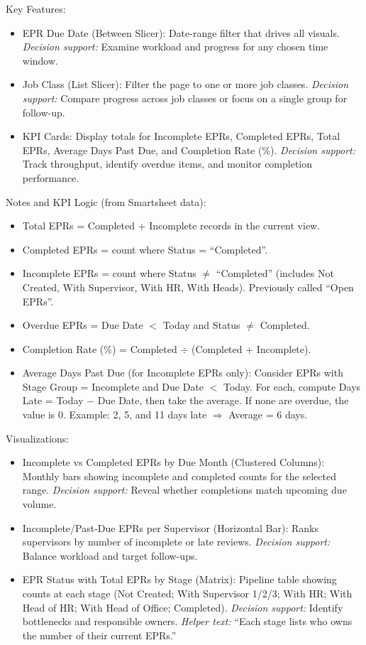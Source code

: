 \documentclass[12pt]{article}
\def\textbf#1{#1}%
\begin{document}
\textbf{Key Features:}
\begin{itemize}[nosep]
  \item \textbf{EPR Due Date (Between Slicer):}
        Date-range filter that drives all visuals.  
        \emph{Decision support:} Examine workload and progress for any chosen time window.
  \item \textbf{Job Class (List Slicer):}
        Filter the page to one or more job classes.  
        \emph{Decision support:} Compare progress across job classes or focus on a single group for follow-up.
  \item \textbf{KPI Cards:}
        Display totals for Incomplete EPRs, Completed EPRs, Total EPRs, Average Days Past Due, and Completion Rate (\%).  
        \emph{Decision support:} Track throughput, identify overdue items, and monitor completion performance.
\end{itemize}

\textbf{Notes and KPI Logic (from Smartsheet data):}
\begin{itemize}[nosep]
  \item \textbf{Total EPRs} = Completed + Incomplete records in the current view.
  \item \textbf{Completed EPRs} = count where Status = ``Completed''.
  \item \textbf{Incomplete EPRs} = count where Status $\neq$ ``Completed'' (includes Not Created, With Supervisor, With HR, With Heads). Previously called ``Open EPRs''.
  \item \textbf{Overdue EPRs} = Due Date $<$ Today and Status $\neq$ Completed.
  \item \textbf{Completion Rate (\%)} = Completed $\div$ (Completed + Incomplete).
  \item \textbf{Average Days Past Due (for Incomplete EPRs only):}  
        Consider EPRs with Stage Group = Incomplete and Due Date $<$ Today.  
        For each, compute Days Late = Today $-$ Due Date, then take the average.  
        If none are overdue, the value is 0. Example: 2, 5, and 11 days late $\Rightarrow$ Average = 6 days.
\end{itemize}

\textbf{Visualizations:}
\begin{itemize}[nosep]
  \item \textbf{Incomplete vs Completed EPRs by Due Month (Clustered Columns):}
        Monthly bars showing incomplete and completed counts for the selected range.  
        \emph{Decision support:} Reveal whether completions match upcoming due volume.
  \item \textbf{Incomplete/Past-Due EPRs per Supervisor (Horizontal Bar):}
        Ranks supervisors by number of incomplete or late reviews.  
        \emph{Decision support:} Balance workload and target follow-ups.
  \item \textbf{EPR Status with Total EPRs by Stage (Matrix):}
        Pipeline table showing counts at each stage (Not Created; With Supervisor 1/2/3; With HR; With Head of HR; With Head of Office; Completed).  
        \emph{Decision support:} Identify bottlenecks and responsible owners.  
        \emph{Helper text:} ``Each stage lists who owns the number of their current EPRs.''
\end{itemize}
\end{document}
